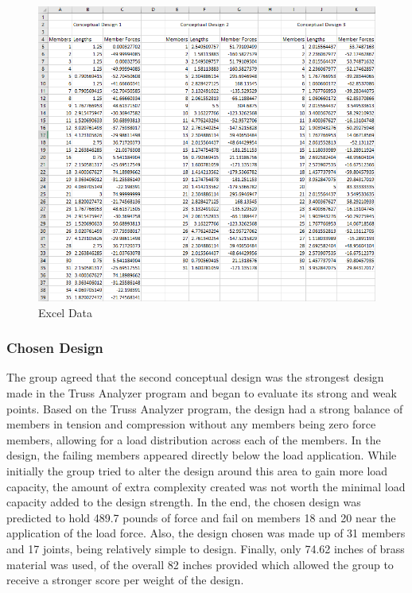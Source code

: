 \documentclass{article}
\begin{document}
\begin{figure}[ht]
\caption{Excel Data}
\centering
\includegraphics[width=450pt]{TrussExcel.png}
\end{figure}

\newpage

\subsubsection{Chosen Design}
The group agreed that the second conceptual design was the strongest design made in the Truss Analyzer program and began to evaluate its strong and weak points. Based on the Truss Analyzer program, the design had a strong balance of members in tension and compression without any members being zero force members, allowing for a load distribution across each of the members. In the design, the failing members appeared directly below the load application. While initially the group tried to alter the design around this area to gain more load capacity, the amount of extra complexity created was not worth the minimal load capacity added to the design strength. In the end, the chosen design was predicted to hold 489.7 pounds of force and fail on members 18 and 20 near the application of the load force. Also, the design chosen was made up of 31 members and 17 joints, being relatively simple to design. Finally, only 74.62 inches of brass material was used, of the overall 82 inches provided which allowed the group to receive a stronger score per weight of the design. 
\end{document}
